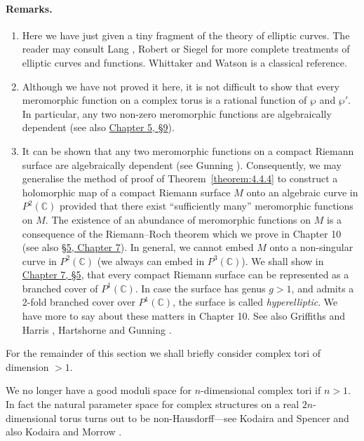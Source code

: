 \paragraph*{Remarks.}
\begin{enumerate}
\item Here we have just given a tiny fragment of the theory of elliptic curves. The reader may consult Lang \cite{bib:I:lang-s:2}, Robert \cite{bib:I:robert-a:1} or Siegel \cite{bib:I:siegel-c-l:1} for more complete treatments of elliptic curves and functions. Whittaker and Watson \cite{bib:I:whittaker-e-t-and-watson-g-n:1} is a classical reference.
\item Although we have not proved it here, it is not difficult to show that every meromorphic function on a complex torus is a rational function of $\wp$ and $\wp'$. In particular, any two non-zero meromorphic functions are algebraically dependent (see also \hyperref[sec:5:9]{Chapter 5, \S9}).
\item It can be shown that any two meromorphic functions on a compact Riemann surface are algebraically dependent (see Gunning \cite[Theorem 26, \S10]{bib:I:gunning-r-c:1}). Consequently, we may generalise the method of proof of Theorem~\ref{theorem:4.4.4} to construct a holomorphic map of a compact Riemann surface $M$ onto an algebraic curve in $P^2(\mathbb C)$ provided that there exist ``sufficiently many'' meromorphic functions on $M$. The existence of an abundance of meromorphic functions on $M$ is a consequence of the Riemann--Roch theorem which we prove in Chapter 10 (see also \hyperref[sec:7:5]{\S5, Chapter 7}). In general, we cannot embed $M$ onto a non-singular curve in $P^2(\mathbb C)$ (we always can embed in $P^3(\mathbb C)$). We shall show in \hyperref[sec:7:5]{Chapter 7, \S5}, that every compact Riemann surface can be represented as a branched cover of $P^1(\mathbb C)$. In case the surface has genus $g>1$, and admits a 2-fold branched cover over $P^1(\mathbb C)$, the surface is called \emph{hyperelliptic}. We have more to say about these matters in Chapter 10. See also Griffiths and Harris \cite{bib:I:griffiths-p-and-harris-j:1}, Hartshorne \cite{bib:I:hartshorne-r:2} and Gunning \cite{bib:I:gunning-r-c:1}.
\end{enumerate}

For the remainder of this section we shall briefly consider complex tori of dimension $>1$.

We no longer have a good moduli space for $n$-dimensional complex tori if $n>1$. In fact the natural parameter space for complex structures on a real $2n$-dimensional torus turns out to be non-Hausdorff---see Kodaira and Spencer \cite[pages 408--414]{bib:I:kodaira-k-and-spencer-d-c:1} and also Kodaira and Morrow \cite[pages 22--23]{bib:I:kodaira-k-and-morrow-j:1}.

